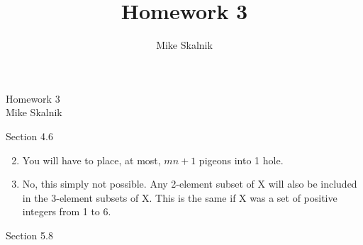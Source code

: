\documentclass[12pt]{article}
\title{Homework 3}
\author{Mike Skalnik}
\newcommand{\s}[1]{\setcounter{enumi}{#1}}
\begin{document}
\begin{flushright}{\large Homework 3\\ Mike Skalnik}\end{flushright}

Section 4.6

\begin{enumerate}
  \s{1}

  \item You will have to place, at most, $m n + 1$ pigeons into 1 hole.

  \item No, this simply not possible. Any 2-element subset of X will also be included in the 3-element subsets of X. This is the same if X was a set of positive integers from 1 to 6.

\end{enumerate}

Section 5.8
\end{document}
